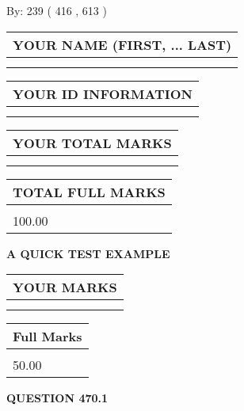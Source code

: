 \documentclass[12pt]{article}
\begin{document}
   
\hspace{1.0in} By: 
 239 ( 416 ,  613 )
   
   
   
   
\newpage 
\setcounter{page}{ 
   470001 } 
   
   
   
   
\noindent\begin{tabular}{|l|}
\hline
YOUR NAME (FIRST, ... LAST)  \\
\hline
 \\ 
 \\ 
\hline
\end{tabular}
\hspace{0.05in} \begin{tabular}{|l|}
\hline
 YOUR   ID   INFORMATION  \\
\hline
 \\ 
 \\ 
\hline
\end{tabular}
   
   
\vspace{0.2in}\noindent\begin{tabular}{|l|}
\hline
YOUR TOTAL MARKS  \\
\hline
 \\ 
 \\ 
\hline
\end{tabular}
\hspace{0.05in} \begin{tabular}{|l|}
\hline
TOTAL FULL MARKS  \\
\hline
 \\ 
100.00 \\
\hline
\end{tabular}
   
   
 \vspace{0.2in}
{\LARGE {\textbf{ A QUICK TEST EXAMPLE}}}
   
   
  
\vspace{0.2in}
  
\noindent\begin{tabular}{|l|}
\hline
 YOUR MARKS  \\
\hline
 \\ 
 \\ 
\hline
\end{tabular}
\hspace{0.05in} \begin{tabular}{|l|}
\hline
 Full Marks  \\
\hline
 \\ 
50.00 \\
\hline
\end{tabular}
{\textbf{\Large{QUESTION
470.1 
}}}
  
\end{document}
